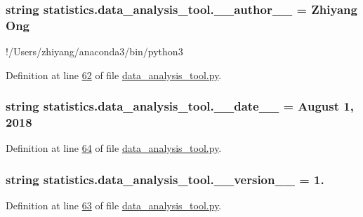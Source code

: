 \subsubsection[{\+\_\+\+\_\+author\+\_\+\+\_\+}]{\setlength{\rightskip}{0pt plus 5cm}string statistics.\+data\+\_\+analysis\+\_\+tool.\+\_\+\+\_\+author\+\_\+\+\_\+ = \textquotesingle{}Zhiyang Ong\textquotesingle{}}\label{namespacestatistics_1_1data__analysis__tool_a0d015dff70798eb64719348296063f84}


!/\+Users/zhiyang/anaconda3/bin/python3 



Definition at line \hyperlink{data__analysis__tool_8py_source_l00062}{62} of file \hyperlink{data__analysis__tool_8py_source}{data\+\_\+analysis\+\_\+tool.\+py}.

\hypertarget{namespacestatistics_1_1data__analysis__tool_a59cd367b85d035e0be0b931b6c346ec8}{}
\subsubsection[{\+\_\+\+\_\+date\+\_\+\+\_\+}]{\setlength{\rightskip}{0pt plus 5cm}string statistics.\+data\+\_\+analysis\+\_\+tool.\+\_\+\+\_\+date\+\_\+\+\_\+ = \textquotesingle{}August 1, 2018\textquotesingle{}}\label{namespacestatistics_1_1data__analysis__tool_a59cd367b85d035e0be0b931b6c346ec8}


Definition at line \hyperlink{data__analysis__tool_8py_source_l00064}{64} of file \hyperlink{data__analysis__tool_8py_source}{data\+\_\+analysis\+\_\+tool.\+py}.

\hypertarget{namespacestatistics_1_1data__analysis__tool_ada80d84be4de19ef8e1df3bf71640e46}{}
\subsubsection[{\+\_\+\+\_\+version\+\_\+\+\_\+}]{\setlength{\rightskip}{0pt plus 5cm}string statistics.\+data\+\_\+analysis\+\_\+tool.\+\_\+\+\_\+version\+\_\+\+\_\+ = \textquotesingle{}1.\textquotesingle{}}\label{namespacestatistics_1_1data__analysis__tool_ada80d84be4de19ef8e1df3bf71640e46}


Definition at line \hyperlink{data__analysis__tool_8py_source_l00063}{63} of file \hyperlink{data__analysis__tool_8py_source}{data\+\_\+analysis\+\_\+tool.\+py}.

